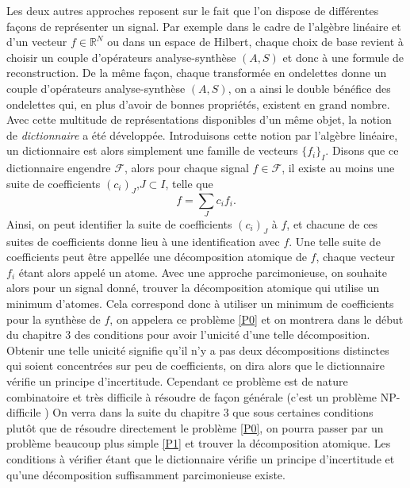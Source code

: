 Les deux autres approches reposent sur le fait que l'on dispose de différentes façons de représenter un signal.
Par exemple dans le cadre de l'algèbre linéaire et d'un vecteur $f \in \mathbb{R}^N$ ou dans un espace de Hilbert, chaque choix de base revient à choisir un couple d'opérateurs analyse-synthèse $(A, S)$ et donc à une formule de reconstruction.
De la même façon, chaque transformée en ondelettes donne un couple d'opérateurs analyse-synthèse $(A, S)$, on a ainsi le double bénéfice des ondelettes qui, en plus d'avoir de bonnes propriétés, existent en grand nombre.
\newline
Avec cette multitude de représentations disponibles d'un même objet, la notion de \emph{dictionnaire} a été développée.
Introduisons cette notion par l'algèbre linéaire, un dictionnaire est alors simplement une famille de vecteurs $\{f_i\}_I$. Disons que ce dictionnaire engendre $\mathcal{F}$, alors pour chaque signal $f\in\mathcal{F}$, il existe au moins une suite de coefficients $(c_i)_J$,$J\subset I$, telle que
\begin{equation}
	f = \sum_J c_i f_i.
\end{equation}
Ainsi, on peut identifier la suite de coefficients $(c_i)_J$ à $f$, et chacune de ces suites de coefficients donne lieu à une identification avec $f$.
Une telle suite de coefficients peut être appellée une décomposition atomique de $f$, chaque vecteur $f_i$ étant alors appelé un atome.
Avec une approche parcimonieuse, on souhaite alors pour un signal donné, trouver la décomposition atomique qui utilise un minimum d'atomes. 
Cela correspond donc à utiliser un minimum de coefficients pour la synthèse de $f$, on appelera ce problème \ref{P0} et on montrera dans le début du chapitre 3 des conditions pour avoir l'unicité d'une telle décomposition.
Obtenir une telle unicité signifie qu'il n'y a pas deux décompositions distinctes qui soient concentrées sur peu de coefficients, on dira alors que le dictionnaire vérifie un principe d'incertitude.
\newline
Cependant ce problème est de nature combinatoire et très difficile à résoudre de façon générale (c'est un problème NP-difficile \cite{NPHard})
On verra dans la suite du chapitre 3 que sous certaines conditions plutôt que de résoudre directement le problème \ref{P0}, on pourra passer par un problème beaucoup plus simple \ref{P1} et trouver la décomposition atomique.
Les conditions à vérifier étant que le dictionnaire vérifie un principe d'incertitude et qu'une décomposition suffisamment parcimonieuse existe.
\newline 
